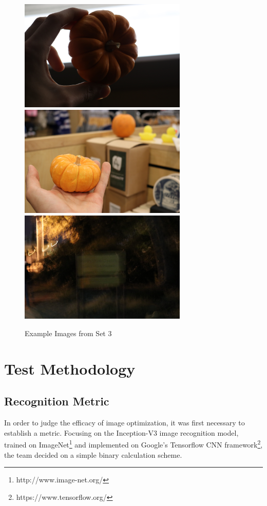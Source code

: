 \documentclass{report}
\begin{document}
\begin{figure}[!htb]
	\begin{center}
		\caption{Example Images from Set 3}
		\label{set3}
		\includegraphics[width=8cm]{set3_pumpkin1.JPG}
		\includegraphics[width=8cm]{set3_pumpkin2.JPG}
		\includegraphics[width=8cm]{set3_other.JPG}
	\end{center}
\end{figure}	

\section{Test Methodology}
\subsection{Recognition Metric}
\label{metric}
In order to judge the efficacy of image optimization, it was first necessary to establish a metric. Focusing on the Inception-V3 image recognition model, trained on ImageNet\footnote{http://www.image-net.org/} and implemented on Google's Tensorflow CNN framework\footnote{https://www.tensorflow.org/}, the team decided on a simple binary calculation scheme.
\end{document}

